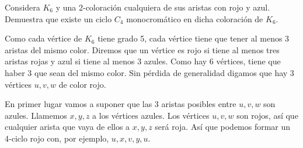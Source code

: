 \documentclass[twoside]{article}
\begin{document}
\newpage

\begin{ejercicio}{2.5}

Considera $K_6$ y una 2-coloración cualquiera de sus aristas con rojo y azul. Demuestra que
existe un ciclo $C_4$ monocromático en dicha coloración de $K_6$.
\end{ejercicio}
\begin{solucion}
 Como cada vértice de $K_6$ tiene grado 5, cada vértice tiene que tener al menos 3 aristas del mismo color. Diremos que un vértice es rojo si tiene al menos tres aristas rojas y azul si tiene al menos 3 azules. Como hay 6 vértices, tiene que haber 3 que sean del mismo color. Sin pérdida de generalidad digamos que hay 3 vértices $u,v,w$ de color rojo. 
 
 En primer lugar vamos a suponer que las 3 aristas posibles entre $u,v,w$ son azules. Llamemos $x,y,z$ a los vértices azules. Los vértices $u,v,w$ son rojos, así que cualquier arista que vaya de ellos a $x,y,z$ será roja. Así que podemos formar un 4-ciclo rojo con, por ejemplo, $u, x,v,y,u$. 
 

\end{solucion}
\end{document}
